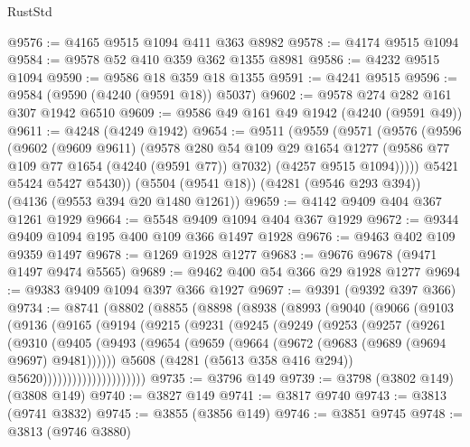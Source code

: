 \begin{lexlean}{RustStd}
\begin{coremodule}
{\begin{coremodule}
{{{{{{{{{{{{{{{{{{{{{{{{{{{{{{{{{{{@9576 := @4165 @9515 @1094 @411 @363 @8982
@9578 := @4174 @9515 @1094
@9584 := @9578 @52 @410 @359 @362 @1355 @8981
@9586 := @4232 @9515 @1094
@9590 := @9586 @18 @359 @18 @1355
@9591 := @4241 @9515
@9596 := @9584 (@9590 (@4240 (@9591 @18)) @5037)
@9602 := @9578 @274 @282 @161 @307 @1942 @6510
@9609 := @9586 @49 @161 @49 @1942 (@4240 (@9591 @49))
@9611 := @4248 (@4249 @1942)
@9654 := @9511
    (@9559
      (@9571
        (@9576
          (@9596
            (@9602
              (@9609 @9611)
              (@9578
                @280
                @54
                @109
                @29
                @1654
                @1277
                (@9586 @77 @109 @77 @1654 (@4240 (@9591 @77)) @7032)
                (@4257 @9515 @1094)))))
        @5421
        @5424
        @5427
        @5430))
    (@5504 (@9541 @18))
    (@4281 (@9546 @293 @394))
    (@4136 (@9553 @394 @20 @1480 @1261))
@9659 := @4142 @9409 @404 @367 @1261 @1929
@9664 := @5548 @9409 @1094 @404 @367 @1929
@9672 := @9344 @9409 @1094 @195 @400 @109 @366 @1497 @1928
@9676 := @9463 @402 @109 @9359 @1497
@9678 := @1269 @1928 @1277
@9683 := @9676 @9678 (@9471 @1497 @9474 @5565)
@9689 := @9462 @400 @54 @366 @29 @1928 @1277
@9694 := @9383 @9409 @1094 @397 @366 @1927
@9697 := @9391 (@9392 @397 @366)
@9734 := @8741
    (@8802
      (@8855
        (@8898
          (@8938
            (@8993
              (@9040
                (@9066
                  (@9103
                    (@9136
                      (@9165
                        (@9194
                          (@9215
                            (@9231
                              (@9245
                                (@9249
                                  (@9253
                                    (@9257
                                      (@9261
                                        (@9310
                                          (@9405
                                            (@9493
                                              (@9654
                                                (@9659
                                                  (@9664
                                                    (@9672 (@9683 (@9689 (@9694 @9697) @9481))))))
                                              @5608
                                              (@4281 (@5613 @358 @416 @294))
                                              @5620)))))))))))))))))))))
@9735 := @3796 @149
@9739 := @3798 (@3802 @149) (@3808 @149)
@9740 := @3827 @149
@9741 := @3817 @9740
@9743 := @3813 (@9741 @3832)
@9745 := @3855 (@3856 @149)
@9746 := @3851 @9745
@9748 := @3813 (@9746 @3880)
}}}}}}}}}}}}}}}}}}}}}}}}}}}}}}}}}}}
\end{coremodule}}
\end{coremodule}
\end{lexlean}
